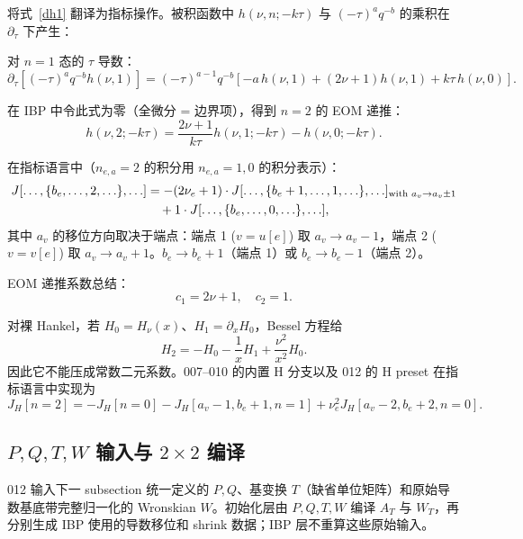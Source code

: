﻿\documentclass[a4paper,11pt]{article}
\begin{document}
将式~\eqref{dh1} 翻译为指标操作。被积函数中 $h(\nu, n; -k\tau)$ 与 $(-\tau)^a q^{-b}$ 的乘积在 $\partial_\tau$ 下产生：

对 $n=1$ 态的 $\tau$ 导数：
\begin{equation}
  \partial_\tau [(-\tau)^a q^{-b} h(\nu, 1)] = (-\tau)^{a-1} q^{-b} \left[ -a\, h(\nu,1) + (2\nu+1) h(\nu,1) + k\tau\, h(\nu,0) \right].
\end{equation}

在 IBP 中令此式为零（全微分 = 边界项），得到 $n=2$ 的 EOM 递推：
\begin{equation}
  \boxed{h(\nu, 2; -k\tau) = \frac{2\nu+1}{k\tau} h(\nu, 1; -k\tau) - h(\nu, 0; -k\tau).}
  \label{EOMrecurrence}
\end{equation}

在指标语言中（$n_{e,a} = 2$ 的积分用 $n_{e,a} = 1, 0$ 的积分表示）：
\begin{align}
  J[\ldots, \{b_e, \ldots, 2, \ldots\}, \ldots] &= -(2\nu_e + 1) \cdot J[\ldots, \{b_e + 1, \ldots, 1, \ldots\}, \ldots]_{\text{with } a_v \to a_v \pm 1} \notag \\
  &\quad + 1 \cdot J[\ldots, \{b_e, \ldots, 0, \ldots\}, \ldots],
  \label{EOMindex}
\end{align}
其中 $a_v$ 的移位方向取决于端点：端点 1 ($v = u[e]$) 取 $a_v \to a_v - 1$，端点 2 ($v = v[e]$) 取 $a_v \to a_v + 1$。$b_e \to b_e + 1$（端点 1）或 $b_e \to b_e - 1$（端点 2）。

EOM 递推系数总结：
\begin{equation}
  c_1 = 2\nu + 1, \quad c_2 = 1.
  \label{EOMcoeffs}
\end{equation}

对裸 Hankel，若 $H_0=H_\nu(x)$、$H_1=\partial_xH_0$，Bessel 方程给
\begin{equation}
 H_2=-H_0-\frac{1}{x}H_1+\frac{\nu^2}{x^2}H_0.
 \label{bareHEOMrecurrence}
\end{equation}
因此它不能压成常数二元系数。007--010 的内置 H 分支以及 012 的 H preset 在指标语言中实现为
\begin{equation}
 J_H[n=2]=-J_H[n=0]-J_H[a_v-1,b_e+1,n=1]
 +\nu_e^2J_H[a_v-2,b_e+2,n=0].
 \label{bareHEOMindex}
\end{equation}

\subsection{$P,Q,T,W$ 输入与 $2\times2$ 编译}

012 输入下一 subsection 统一定义的 $P,Q$、基变换 $T$（缺省单位矩阵）和原始导数基底带完整归一化的 Wronskian $W$。初始化层由 $P,Q,T,W$ 编译 $A_T$ 与 $W_T$，再分别生成 IBP 使用的导数移位和 shrink 数据；IBP 层不重算这些原始输入。
\end{document}
